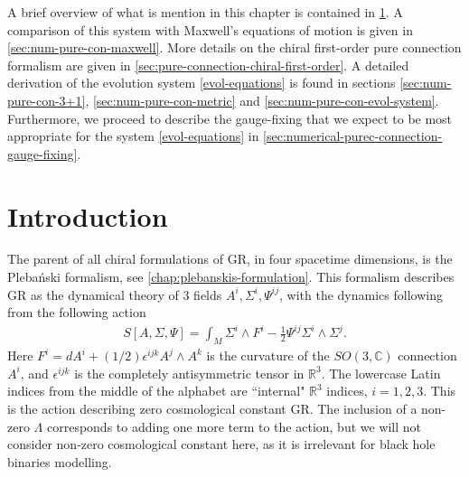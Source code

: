 \documentclass[10pt]{report}
\newcommand{\pleb}[0]{Pleba\'nski}
\theoremstyle{definition}
\newcommand{\R}[0]{\mathbb{R}}
\newcommand{\C}[0]{\mathbb{C}}
\begin{document}
A brief overview of what is mention in this chapter is contained in \cref{sec:num-pure-con-relativity-introduction}. A comparison of this system with Maxwell's equations of motion is given in \cref{sec:num-pure-con-maxwell}. More details on the chiral first-order pure connection formalism are given in \cref{sec:pure-connection-chiral-first-order}. A detailed derivation of the evolution system \cref{evol-equations} is found in sections \ref{sec:num-pure-con-3+1}, \ref{sec:num-pure-con-metric} and \ref{sec:num-pure-con-evol-system}. Furthermore, we proceed to describe the gauge-fixing that we expect to be most appropriate for the system \cref{evol-equations} in \cref{sec:numerical-purec-connection-gauge-fixing}.

\section{Introduction} \label{sec:num-pure-con-relativity-introduction}

The parent of all chiral formulations of GR, in four spacetime dimensions, is the \pleb{} formalism, see \cref{chap:plebanskis-formulation}. This formalism describes GR as the dynamical theory of 3 fields $A^i, \Sigma^i, \Psi^{ij}$, with the dynamics following from the following action
\begin{align}\label{action-Pleb}
S[A,\Sigma,\Psi] = \int_M \Sigma^i \wedge F^i - \frac{1}{2}\Psi^{ij} \Sigma^i\wedge \Sigma^j.
\end{align}
Here $F^i = dA^i + (1/2)\epsilon^{ijk} A^j\wedge A^k$ is the curvature of the $SO(3,\C)$ connection $A^i$, and $\epsilon^{ijk}$ is the completely antisymmetric tensor in $\R^3$. The lowercase Latin indices from the middle of the alphabet are ``internal" $\R^3$ indices, $i=1,2,3$. This is the action describing zero cosmological constant GR. The inclusion of a non-zero $\Lambda$ corresponds to adding one more term to the action, but we will not consider non-zero cosmological constant here, as it is irrelevant for black hole binaries modelling.
\end{document}
